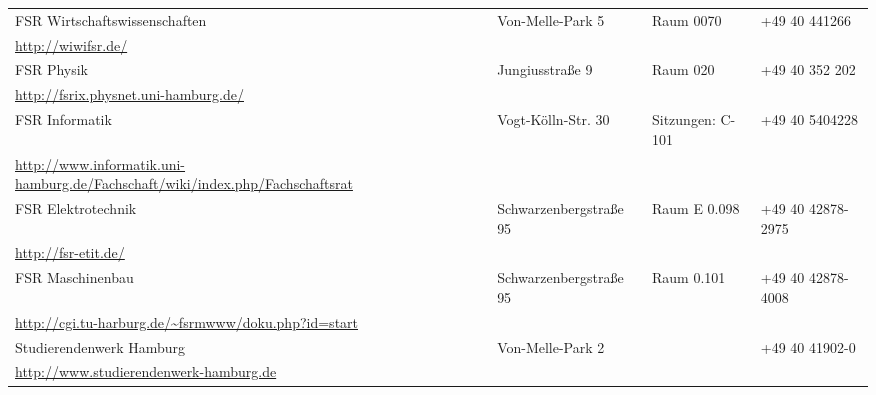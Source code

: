\documentclass[11pt,a4paper,oneside,landscape]{article}
\begin{document}
\begin{tabularx}{\textwidth}{|X|X|X|X|}
\hline FSR Wirtschaftswissenschaften&Von-Melle-Park 5&Raum 0070&+49 40 441266\\
       \url{http://wiwifsr.de/}&&&\\ %
\hline FSR Physik&Jungiusstraße 9&Raum 020&+49 40 352 202\\
       \url{http://fsrix.physnet.uni-hamburg.de/}&&&\\ %
\hline FSR Informatik&Vogt-Kölln-Str. 30&Sitzungen: C-101&+49 40 5404228\\
       \url{http://www.informatik.uni-hamburg.de/Fachschaft/wiki/index.php/Fachschaftsrat}&&&\\ %
\hline FSR Elektrotechnik&Schwarzenbergstraße 95&Raum E 0.098&+49 40 42878-2975\\
       \url{http://fsr-etit.de/}&&&\\ %
\hline FSR Maschinenbau&Schwarzenbergstraße 95&Raum 0.101&+49 40 42878-4008\\
       \url{http://cgi.tu-harburg.de/~fsrmwww/doku.php?id=start}&&&\\ %
\hline Studierendenwerk Hamburg&Von-Melle-Park 2&&+49 40 41902-0\\
       \url{http://www.studierendenwerk-hamburg.de}&&&\\ %
\hline
\end{tabularx}
\clearpage
\end{document}
